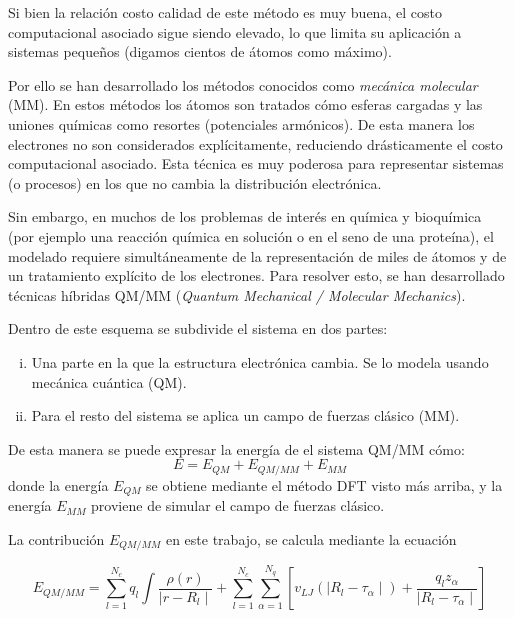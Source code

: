 Si bien la relaci\'on costo calidad de este m\'etodo es muy buena, el costo computacional asociado sigue siendo elevado, lo que limita su aplicaci\'on a sistemas peque\~nos (digamos cientos de \'atomos como m\'aximo).

Por ello se han desarrollado los m\'etodos conocidos como \emph{mec\'anica molecular} (MM). 
En estos m\'etodos los \'atomos son tratados c\'omo esferas cargadas y las uniones qu\'imicas como resortes (potenciales arm\'onicos).
De esta manera los electrones no son considerados expl\'icitamente, reduciendo dr\'asticamente el costo computacional asociado. 
Esta t\'ecnica es muy poderosa para representar sistemas (o procesos) en los que no cambia la distribuci\'on electr\'onica.

Sin embargo, en muchos de los problemas de inter\'es en qu\'imica y bioqu\'imica (por ejemplo una reacci\'on qu\'imica en soluci\'on o en el seno de una prote\'ina), el modelado requiere simult\'aneamente de la representaci\'on de miles de \'atomos y de un tratamiento expl\'icito de los electrones.
Para resolver esto, se han desarrollado t\'ecnicas h\'ibridas QM/MM (\textit{Quantum Mechanical / Molecular Mechanics}).

Dentro de este esquema se subdivide el sistema en dos partes:
\begin{enumerate}[i)]
\item Una parte en la que la estructura electr\'onica cambia. Se lo modela usando mec\'anica cu\'antica (QM).

\item Para el resto del sistema se aplica un campo de fuerzas cl\'asico (MM).
\end{enumerate}

De esta manera se puede expresar la energ\'ia de el sistema QM/MM c\'omo:
\begin{equation}
    E = E_{QM} + E_{QM/MM} + E_{MM}
\end{equation}
donde la energ\'ia $E_{QM}$ se obtiene mediante el m\'etodo DFT visto m\'as arriba, y la energ\'ia $E_{MM}$ proviene de simular el campo de fuerzas cl\'asico.

La contribuci\'on $E_{QM/MM}$ en este trabajo, se calcula mediante la ecuaci\'on

\begin{equation}
    E_{QM/MM} = \sum_{l = 1}^{N_c} q_l \int \frac{\rho(r)}{\mid r - R_l \mid} + \sum_{l = 1}^{N_c}\sum_{\alpha = 1}^{N_q} [ v_{LJ} ( \mid R_l - \tau_\alpha \mid ) + \frac{q_l z_\alpha}{\mid R_l - \tau_\alpha \mid} ]
\end{equation}

